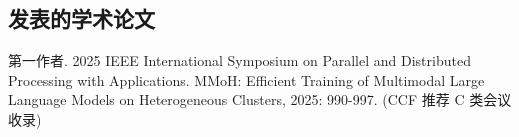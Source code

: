 \begin{resume}
     
   
   \section*{发表的学术论文} %
 
   \begin{enumerate}[label={[\arabic*]},itemsep=0pt,parsep=0pt,labelindent=26pt,labelwidth=*,leftmargin=0pt,itemindent=*,align=left]
    
   \item 第一作者. 2025 IEEE International Symposium on Parallel and Distributed Processing with Applications. MMoH: Efficient Training of Multimodal Large Language Models on Heterogeneous Clusters, 2025: 990-997. (CCF 推荐 C 类会议收录)
   \end{enumerate}
 \end{resume}
 